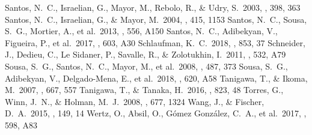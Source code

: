 \documentclass[twocolumn, dvipdfmx]{aastex62}
\begin{document}
\begin{CJK*}{UTF8}{min}
\begin{thebibliography}{}
 Santos, N.~C., Israelian, G., Mayor, M., Rebolo, R., \& Udry, S.\ 2003, \aap, 398, 363
 Santos, N.~C., Israelian, G., \& Mayor, M.\ 2004, \aap, 415, 1153
 Santos, N.~C., Sousa, S.~G., Mortier, A., et al.\ 2013, \aap, 556, A150
 Santos, N.~C., Adibekyan, V., Figueira, P., et al.\ 2017, \aap, 603, A30
 Schlaufman, K.~C.\ 2018, \apj, 853, 37
 Schneider, J., Dedieu, C., Le Sidaner, P., Savalle, R., \& Zolotukhin, I.\ 2011, \aap, 532, A79
 Sousa, S.~G., Santos, N.~C., Mayor, M., et al.\ 2008, \aap, 487, 373
 Sousa, S.~G., Adibekyan, V., Delgado-Mena, E., et al.\ 2018, \aap, 620, A58
 Tanigawa, T., \& Ikoma, M.\ 2007, \apj, 667, 557
 Tanigawa, T., \& Tanaka, H.\ 2016, \apj, 823, 48
 Torres, G., Winn, J.~N., \& Holman, M.~J.\ 2008, \apj, 677, 1324
 Wang, J., \& Fischer, D.~A.\ 2015, \aj, 149, 14
 Wertz, O., Absil, O., G{\'o}mez Gonz{\'a}lez, C.~A., et al.\ 2017, \aap, 598, A83

\end{thebibliography}





\end{CJK*}
\end{document}
